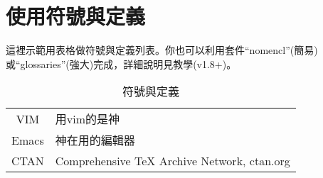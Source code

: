 \documentclass[class=NCU_thesis, crop=false]{standalone}
\begin{document}
\chapter{使用符號與定義}
這裡示範用表格做符號與定義列表。你也可以利用套件``nomencl''(簡易)或``glossaries''(強大)完成，詳細說明見教學(v1.8+)。

\begin{table}[h]
    \normalsize %
    \centering
    \begin{tabular}{c@{\quad：}l}
        VIM     & 用vim的是神 \\ 
        Emacs   & 神在用的編輯器 \\ 
        CTAN    & Comprehensive TeX Archive Network, ctan.org \\
        
    \end{tabular} 
    \caption*{符號與定義} %
    \label{table:symbol_def}
\end{table}
\end{document}
